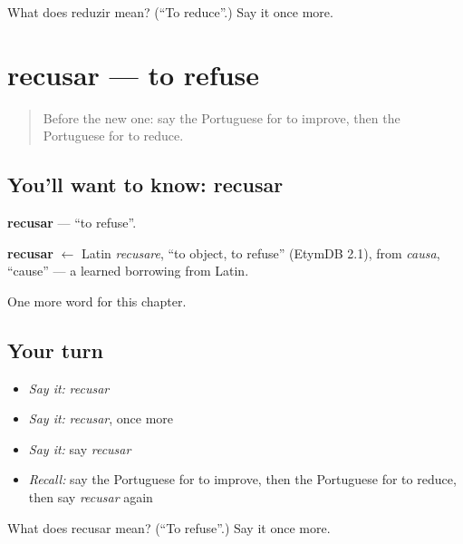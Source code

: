 \begin{tcolorbox}[breakable,colback=teal!4,colframe=teal!35!black,title={Before you move on}]
What does reduzir mean? (\textquotedblleft{}To reduce\textquotedblright{}.) Say it once more.
\end{tcolorbox}
\section[recusar]{recusar — to refuse}

\label{lesson:PT-C176-recusar}



\begin{quote}
Before the new one: say the Portuguese for to improve, then the Portuguese for to reduce.
\end{quote}

\subsection*{You'll want to know: recusar}
\textbf{recusar} — \textquotedblleft{}to refuse\textquotedblright{}.

\begin{cousinweb}
\textbf{recusar} $\leftarrow$ Latin \emph{recusare}, \textquotedblleft{}to object, to refuse\textquotedblright{} (EtymDB 2.1), from \emph{causa}, \textquotedblleft{}cause\textquotedblright{} — a learned borrowing from Latin.
\end{cousinweb}

\begin{grammarlens}[title={What you've built}]
One more word for this chapter.
\end{grammarlens}

\subsection*{Your turn}
\begin{itemize}
\raggedright
  \item \emph{Say it:} \emph{recusar}
  \item \emph{Say it:} \emph{recusar}, once more
  \item \emph{Say it:} say \emph{recusar}
  \item \emph{Recall:} say the Portuguese for to improve, then the Portuguese for to reduce, then say \emph{recusar} again
\end{itemize}

\begin{tcolorbox}[breakable,colback=teal!4,colframe=teal!35!black,title={Before you move on}]
What does recusar mean? (\textquotedblleft{}To refuse\textquotedblright{}.) Say it once more.
\end{tcolorbox}
